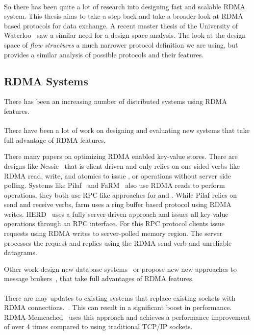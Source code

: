 \paragraph{} So there has been quite a lot of research into designing fast and scalable RDMA system. This thesis aims to take
a step back and take a broader look at RDMA based protocols for data exchange. A recent master thesis of the University of 
Waterloo~\cite{sharma2020design} saw a similar need for a design space analysis. The look at the design space of \emph{flow structures} 
a much narrower protocol definition we are using, but provides a similar analysis of possible protocols and their features.


\subsection{RDMA Systems}

There has been an increasing number of distributed systems using RDMA features. 

\paragraph{} There have been a lot of work on designing and evaluating new systems that take full advantage of RDMA features.

There many papers on optimizing RDMA enabled key-value stores. There are designs like Nessie~\cite{nessie} that is 
client-driven and only relies on one-sided verbs like RDMA read, write, and atomics to issue , 
or  operations without server side polling.
Systems like Pilaf~\cite{pilaf} and FaRM~\cite{farm} also use RDMA reads to perform  operations, they both use 
RPC like approaches for  and . While Pilaf relies on send and receive verbs, farm uses a ring buffer
based protocol using RDMA writes.
HERD~\cite{herd} uses a fully server-driven approach and issues all key-value operations through an RPC interface. For this
RPC protocol clients issue requests using RDMA writes to server-polled memory region. The server processes the request and
replies using the RDMA send verb and unreliable datagrams.

Other work design new database systems~\cite{dbrackjoin} or propose new new approaches to message brokers~\cite{broker},
that take full advantages of RDMA features. 

\paragraph{} There are may updates to existing systems that replace existing sockets with RDMA 
connections.~\cite{memcached, hbase, hdfs}. This can result in a significant boost in performance. RDMA-Memcached~\cite{memcached} 
uses this approach and achieves a performance improvement of over 4 times compared to using traditional TCP/IP sockets.

